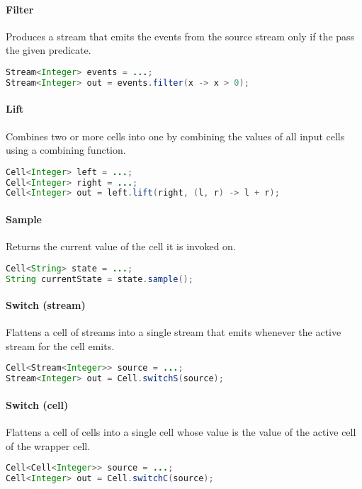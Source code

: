 \paragraph{Filter}
Produces a stream that emits the events from the source stream only if the pass the given predicate.
%
\begin{lstlisting}[frame=single, language=java]
Stream<Integer> events = ...;
Stream<Integer> out = events.filter(x -> x > 0);
\end{lstlisting}

\paragraph{Lift}
Combines two or more cells into one by combining the values of all input cells using a combining function.
%
\begin{lstlisting}[frame=single, language=java]
Cell<Integer> left = ...;
Cell<Integer> right = ...;
Cell<Integer> out = left.lift(right, (l, r) -> l + r);
\end{lstlisting}

\paragraph{Sample}
Returns the current value of the cell it is invoked on.
%
\begin{lstlisting}[frame=single, language=java]
Cell<String> state = ...;
String currentState = state.sample();
\end{lstlisting}
  
\paragraph{Switch (stream)}
Flattens a cell of streams into a single stream that emits whenever the active stream for the cell emits.
%
\begin{lstlisting}[frame=single, language=java]
Cell<Stream<Integer>> source = ...;
Stream<Integer> out = Cell.switchS(source);
\end{lstlisting}

\paragraph{Switch (cell)}
Flattens a cell of cells into a single cell whose value is the value of the active cell of the wrapper cell.
\begin{lstlisting}[frame=single, language=java]
Cell<Cell<Integer>> source = ...;
Cell<Integer> out = Cell.switchC(source);
\end{lstlisting}


